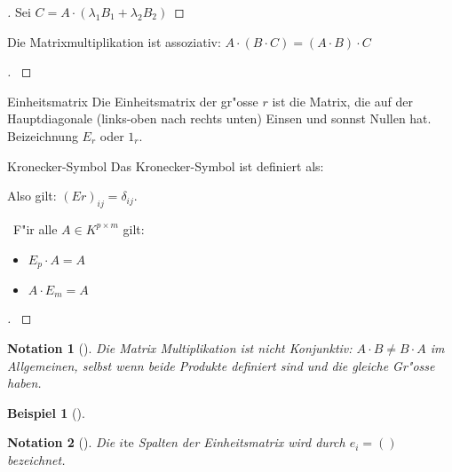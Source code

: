\documentclass[11pt]{article}
\newtheorem{exa}{Beispiel}[section]
\newtheorem*{notation}{Notation}
\begin{document}
\begin{proof}[] \label{}
Sei \(C=A\cdot (\lambda_1 B_1 + \lambda_2 B_2)\)
\end{proof}

\begin{relation}
Die Matrixmultiplikation ist assoziativ: \(A\cdot (B\cdot C)=(A\cdot B)\cdot C\)
\end{relation}

\begin{proof}[] \label{}

\end{proof}

\begin{definition}{Einheitsmatrix}{}
Die Einheitsmatrix der gr"osse \(r\) ist die Matrix, die auf der Hauptdiagonale
(links-oben nach rechts unten) Einsen und sonnst Nullen hat. Beizeichnung \(E_r\)
oder \(1_r\).
\end{definition}

\begin{definition}{Kronecker-Symbol}{}
Das Kronecker-Symbol ist definiert als: 

Also gilt: \((Er)_{ij}=\delta_{ij}\).
\end{definition}

\begin{theo}{}{} \
F"ir alle \(A\in K^{p\times m}\) gilt:
\begin{itemize}
\item \(E_p\cdot A=A\)
\item \(A\cdot E_m =A\)
\end{itemize}
\end{theo}

\begin{proof}[] \label{}

\end{proof}


\begin{notation}[] \label{Vorsicht!}
Die Matrix Multiplikation ist nicht Konjunktiv: \(A\cdot B\not= B\cdot A\) im
Allgemeinen, selbst wenn beide Produkte definiert sind und die gleiche Gr"osse
haben.
\end{notation}

\begin{exa}[] \label{}

\end{exa}

\begin{notation}[] \label{}
Die \(i\text{te}\) Spalten der Einheitsmatrix wird durch \(e_i=()\) bezeichnet.
\end{notation}
\end{document}
